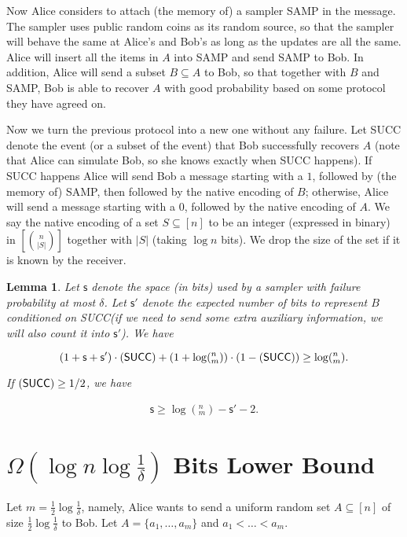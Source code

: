 \documentclass[10pt]{article}
\let\Pr\relax
\DeclareMathOperator*{\Pr}{\mathbb{P}}
\newtheorem{lemma}{Lemma}
\newcommand{\samp}{\textsf{SAMP}\xspace}
\newcommand{\success}{\textsf{SUCC}\xspace}
\newcommand{\s}{\textsf{s}\xspace}
\begin{document}
Now Alice considers to attach (the memory of) a sampler \samp in the message. The sampler uses public random coins as its random source, so that the sampler will behave the same at Alice's and Bob's as long as the updates are all the same. Alice will insert all the items in $A$ into \samp and send \samp to Bob. In addition, Alice will send a subset $B\subseteq A$ to Bob, so that together with $B$ and \samp, Bob is able to recover $A$ with good probability based on some protocol they have agreed on. 
 
Now we turn the previous protocol into a new one without any failure. Let \success denote the event (or a subset of the event) that Bob successfully recovers $A$ (note that Alice can simulate Bob, so she knows exactly when \success happens). If \success happens Alice will send Bob a message starting with a $1$, followed by (the memory of) \samp, then followed by the native encoding of $B$; otherwise, Alice will send a message starting with a $0$, followed by the native encoding of $A$. We say the native encoding of a set $S\subseteq [n]$ to be an integer (expressed in binary) in $[{n \choose |S|}]$ together with $|S|$ (taking $\log n$ bits). We drop the size of the set if it is known by the receiver.

\begin{lemma} \label{lemma:lb-meta}
  Let $\s$ denote the space (in bits) used by a sampler with failure probability at most $\delta$. Let $\s'$ denote the expected number of bits to represent $B$ conditioned on \success (if we need to send some extra auxiliary information, we will also count it into $\s'$). We have 
  
  $$(1+\s+\s')\cdot \Pr(\success)+(1+\log (^n_m)) \cdot (1-\Pr(\success)) \ge \log (^n_m).$$
  
  If $\Pr(\success)\ge 1/2$, we have 
  
  \begin{align} \label{formula:lb-meta}
  \s\ge \log (^n_m) - \s' - 2.
  \end{align} 
\end{lemma}

\section{$\Omega(\log n \log {\frac{1}{\delta}})$ Bits Lower Bound}
Let $m=\frac{1}{2}\log \frac{1}{\delta}$, namely, Alice wants to send a uniform random set $A\subseteq [n]$ of size $\frac{1}{2}\log\frac{1}{\delta}$ to Bob. Let $A=\{a_1,\ldots,a_m\}$ and $a_1<\ldots<a_m$. 
\end{document}
